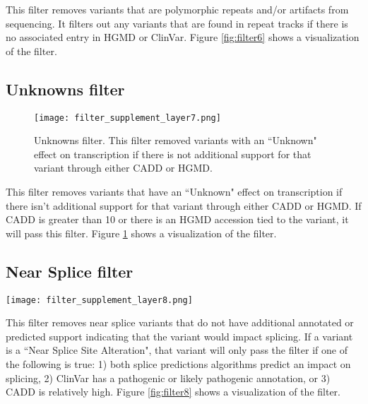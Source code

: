 \documentclass{article}
\begin{document}
This filter removes variants that are polymorphic repeats and/or artifacts from sequencing.  It filters out any variants that are found in repeat tracks if there is no associated entry in HGMD or ClinVar.  Figure \ref{fig:filter6} shows a visualization of the filter.

\subsection{Unknowns filter}

\begin{figure}
\centering
\texttt{[image: filter\_supplement\_layer7.png]}
\caption{Unknowns filter.  This filter removed variants with an ``Unknown" effect on transcription if there is not additional support for that variant through either CADD or HGMD.}
\label{fig:filter7}
\end{figure}

This filter removes variants that have an ``Unknown" effect on transcription if there isn't additional support for that variant through either CADD or HGMD.  If CADD is greater than 10 or there is an HGMD accession tied to the variant, it will pass this filter.  Figure \ref{fig:filter7} shows a visualization of the filter.

\subsection{Near Splice filter}

\begin{sidewaysfigure}
\centering
\texttt{[image: filter\_supplement\_layer8.png]}
\caption{Near Splice filter.  This filter removes ``Near Splice Site Alteration" variants that are not supported to be deleterious by splice prediction algorithms, ClinVar annotations, or CADD predictions.}
\label{fig:filter8}
\end{sidewaysfigure}

This filter removes near splice variants that do not have additional annotated or predicted support indicating that the variant would impact splicing.  If a variant is a ``Near Splice Site Alteration", that variant will only pass the filter if one of the following is true: 1) both splice predictions algorithms predict an impact on splicing, 2) ClinVar has a pathogenic or likely pathogenic annotation, or 3) CADD is relatively high.  Figure \ref{fig:filter8} shows a visualization of the filter. 
\end{document}
